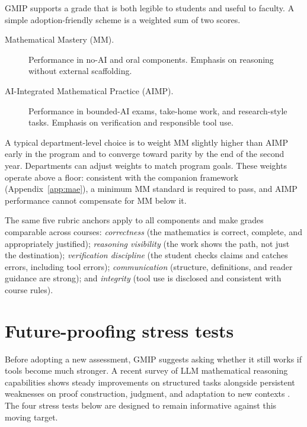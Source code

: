 \documentclass{SIAMbook2023}
\begin{document}
GMIP supports a grade that is both legible to students and useful to faculty. A simple adoption-friendly scheme is a weighted sum of two scores.

\begin{description}
\item[Mathematical Mastery (MM).] Performance in no-AI and oral components. Emphasis on reasoning without external scaffolding.

\item[AI-Integrated Mathematical Practice (AIMP).] Performance in bounded-AI exams, take-home work, and research-style tasks. Emphasis on verification and responsible tool use.
\end{description}

A typical department-level choice is to weight MM slightly higher than AIMP early in the program and to converge toward parity by the end of the second year. Departments can adjust weights to match program goals. These weights operate above a floor: consistent with the companion framework (Appendix~\ref{app:mae}), a minimum MM standard is required to pass, and AIMP performance cannot compensate for MM below it.

The same five rubric anchors apply to all components and make grades comparable across courses: \emph{correctness} (the mathematics is correct, complete, and appropriately justified); \emph{reasoning visibility} (the work shows the path, not just the destination); \emph{verification discipline} (the student checks claims and catches errors, including tool errors); \emph{communication} (structure, definitions, and reader guidance are strong); and \emph{integrity} (tool use is disclosed and consistent with course rules).

\section{Future-proofing stress tests}
\label{app:gmip-stress}%
%

Before adopting a new assessment, GMIP suggests asking whether it still works if tools become much stronger. A recent survey of LLM mathematical reasoning capabilities shows steady improvements on structured tasks alongside persistent weaknesses on proof construction, judgment, and adaptation to new contexts \citep{ahn2024large}. The four stress tests below are designed to remain informative against this moving target.
\end{document}
